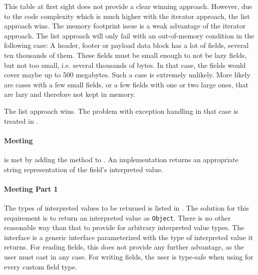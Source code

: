 This table at first sight does not provide a clear winning approach. However, due to the code complexity which is much higher with the iterator approach, the list approach wins. The memory footprint issue is a weak advantage of the iterator approach. The list approach will only fail with an out-of-memory condition in the following case: A header, footer or payload data block has a lot of fields, several ten thousands of them. These fields must be small enough to not be lazy fields, but not too small, i.e. several thousands of bytes. In that case, the fields would cover 
maybe up to 500 megabytes. Such a case is extremely unlikely. More likely are cases with a few small fields, or a few fields with one or two large ones, that are lazy and therefore not kept in memory.

The list approach wins. The problem with exception handling in that case is treated in .


\paragraph{Meeting \REQUfieldInterpValueString{}}
\label{sec:MeetingREQUfieldInterpValueString}

\REQUfieldInterpValueString{} is met by adding the method \METHgetStringValue{} to \IFField{}. An \IFField{} implementation returns an appropriate string representation of the field's interpreted value.


\paragraph{Meeting \REQUfieldInterpValueTyped{} Part 1}
\label{sec:MeetingREQUfieldInterpValueTyped1}

The types of interpreted values to be returned is listed in . The solution for this requirement is to return an interpreted value as \texttt{Object}. There is no other reasonable way than that to provide for arbitrary interpreted value types. The \IFField{} interface is a generic interface parameterized with the type of interpreted value it returns. For reading fields, this does not provide any further advantage, as the user must cast in any case. For writing fields, the user is type-safe when using \IFField{} for every custom field type.

